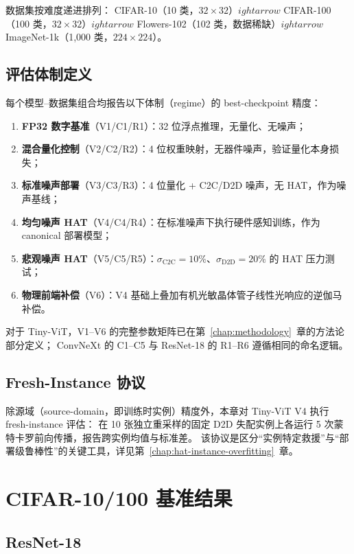 数据集按难度递进排列：
CIFAR-10（10 类，$32\times32$）$
ightarrow$ CIFAR-100（100 类，$32\times32$）$
ightarrow$
Flowers-102（102 类，数据稀缺）$
ightarrow$ ImageNet-1k（1{,}000 类，$224\times224$）。

\subsection{评估体制定义}

每个模型--数据集组合均报告以下体制（regime）的 best-checkpoint 精度：
\begin{enumerate}
    \item \textbf{FP32 数字基准}（V1/C1/R1）：32 位浮点推理，无量化、无噪声；
    \item \textbf{混合量化控制}（V2/C2/R2）：4 位权重映射，无器件噪声，验证量化本身损失；
    \item \textbf{标准噪声部署}（V3/C3/R3）：4 位量化 + C2C/D2D 噪声，无 HAT，作为噪声基线；
    \item \textbf{均匀噪声 HAT}（V4/C4/R4）：在标准噪声下执行硬件感知训练，作为 canonical 部署模型；
    \item \textbf{悲观噪声 HAT}（V5/C5/R5）：$\sigma_{\mathrm{C2C}}=10\%$、$\sigma_{\mathrm{D2D}}=20\%$ 的 HAT 压力测试；
    \item \textbf{物理前端补偿}（V6）：V4 基础上叠加有机光敏晶体管子线性光响应的逆伽马补偿。
\end{enumerate}

对于 Tiny-ViT，V1--V6 的完整参数矩阵已在第~\ref{chap:methodology}~章的方法论部分定义；
ConvNeXt 的 C1--C5 与 ResNet-18 的 R1--R6 遵循相同的命名逻辑。

\subsection{Fresh-Instance 协议}

除源域（source-domain，即训练时实例）精度外，本章对 Tiny-ViT V4 执行 fresh-instance 评估：
在 10 张独立重采样的固定 D2D 失配实例上各运行 5 次蒙特卡罗前向传播，报告跨实例均值与标准差。
该协议是区分``实例特定救援''与``部署级鲁棒性''的关键工具，详见第~\ref{chap:hat-instance-overfitting}~章。

\section{CIFAR-10/100 基准结果}

\subsection{ResNet-18}

